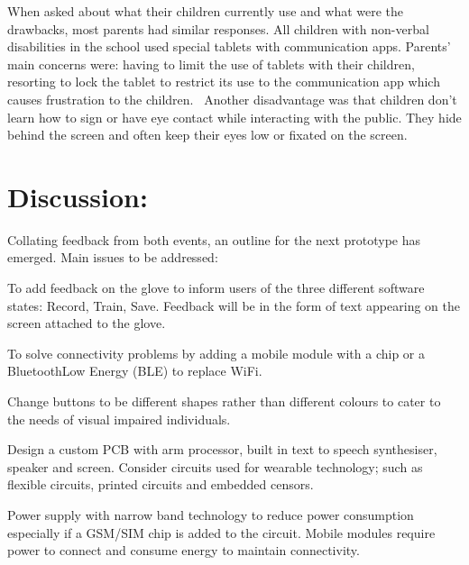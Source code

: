 When asked about what their children currently use and what were the drawbacks, most parents had similar responses.  All children with non-verbal disabilities in the school used special tablets with communication apps. Parents' main concerns were: having to limit the use of tablets with their children, resorting to lock the tablet to restrict its use to the communication app which causes frustration to the children.  Another disadvantage was that children don’t learn how to sign or have eye contact while interacting with the public. They hide behind the screen and often keep their eyes low or fixated on the screen. 

\section{Discussion:}

Collating feedback from both events, an outline for the next prototype has emerged.  Main issues to be addressed:

To add feedback on the glove to inform users of the three different software states: Record, Train, Save.  Feedback will be in the form of text appearing on the screen attached to the glove. 

To solve connectivity problems by adding a mobile module with a chip or a Bluetooth\texttrademark Low Energy (BLE) to replace WiFi\texttrademark. 

Change buttons to be different shapes rather than different colours to cater to the needs of visual impaired individuals.

Design a custom PCB with arm processor, built in text to speech synthesiser, speaker and screen. Consider circuits used for wearable technology; such as flexible circuits, printed circuits and embedded censors. 

Power supply with narrow band technology to reduce power consumption especially if a GSM/SIM chip is added to the circuit.  Mobile modules require power to connect and consume energy to maintain connectivity.  








